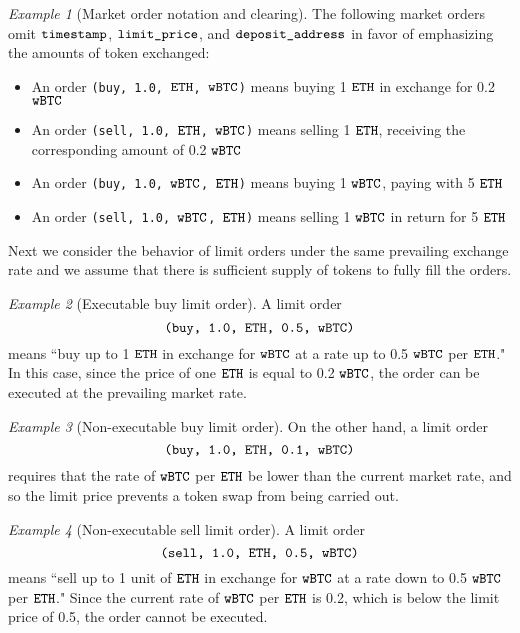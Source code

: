 \documentclass[11pt, reqno]{amsart}
\theoremstyle{definition}
\theoremstyle{remark}
\newtheorem{exmp}{Example}[subsection]
\newcommand{\BTC}{\textnormal{\texttt{wBTC}}}
\newcommand{\ETH}{\textnormal{\texttt{ETH}}}
\newcommand{\timestamp}{\textnormal{\texttt{timestamp}}}
\newcommand{\limitprice}{\textnormal{\texttt{limit\_price}}}
\newcommand{\depositaddress}{\textnormal{\texttt{deposit\_address}}}
\newcommand{\buy}{\textnormal{\texttt{buy}}}
\newcommand{\sell}{\textnormal{\texttt{sell}}}
\begin{document}
\begin{exmp}[Market order notation and clearing]
The following market orders omit $\timestamp$, $\limitprice$, and
$\depositaddress$ in favor of emphasizing the amounts of token exchanged:
\begin{itemize}
    \item An order \texttt{(\buy, 1.0, $\ETH$, $\BTC$)} means buying 1
          $\ETH$ in exchange for 0.2 $\BTC$
    \item An order \texttt{(\sell, 1.0, $\ETH$, $\BTC$)} means selling 1 $\ETH$,
          receiving the corresponding amount of 0.2 $\BTC$
    \item An order \texttt{(\buy, 1.0, $\BTC$, $\ETH$)} means buying 1 $\BTC$,
          paying with 5 $\ETH$
    \item An order \texttt{(\sell, 1.0, $\BTC$, $\ETH$)} means selling 
          1 $\BTC$ in return for 5 $\ETH$
\end{itemize}
\end{exmp}
Next we consider the behavior of limit orders under the same prevailing exchange
rate and we assume that there is sufficient supply of tokens to fully fill the
orders.

\begin{exmp}[Executable buy limit order]
A limit order
\[
    \texttt{(\buy, 1.0, $\ETH$, 0.5, $\BTC$)}
\]
means
``buy up to 1 $\ETH$ in exchange for $\BTC$ at a rate up to 0.5 $\BTC$ per $\ETH$."
In this case, since the price of one $\ETH$ is equal to 0.2 $\BTC$, the order
can be executed at the prevailing market rate.
\end{exmp}

\begin{exmp}[Non-executable buy limit order]
On the other hand, a limit order
\[
    \texttt{(\buy, 1.0, $\ETH$, 0.1, $\BTC$)}
\]
requires that the rate of $\BTC$ per $\ETH$ be lower than the current market
rate, and so the limit price prevents a token swap from being carried out.
\end{exmp}

\begin{exmp}[Non-executable sell limit order]
A limit order
\[
    \texttt{(\sell, 1.0, $\ETH$, 0.5, $\BTC$)}
\]
means
``sell up to 1 unit of $\ETH$ in exchange for $\BTC$ at a rate down to 0.5 $\BTC$ per $\ETH$."
Since the current rate of $\BTC$ per $\ETH$ is 0.2, which is below the limit
price of 0.5, the order cannot be executed.
\end{exmp}

\end{document}
